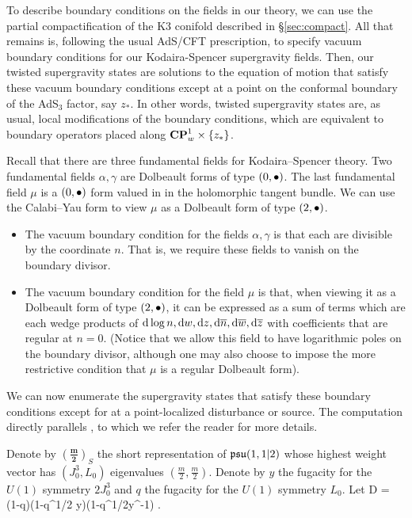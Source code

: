 \documentclass[../main.tex]{subfiles}
\begin{document}
To describe boundary conditions on the fields in our theory, we can use the partial compactification of the K3 conifold described in \S \ref{sec:compact}. All that remains is, following the usual AdS/CFT prescription, to specify vacuum boundary conditions for our Kodaira-Spencer supergravity fields. Then, our twisted supergravity states are solutions to the equation of motion that satisfy these vacuum boundary conditions except at a point on the conformal boundary of the AdS$_3$ factor, say $z_*$. In other words, twisted supergravity states are, as usual, local modifications of the boundary conditions, which are equivalent to boundary operators placed along  $\mathbf{CP}^1_w \times \left\lbrace z_* \right\rbrace$. 

Recall that there are three fundamental fields for Kodaira--Spencer theory.
Two fundamental fields $\alpha, \gamma$ are Dolbeault forms of type $(0,{\bullet})$.
The last fundamental field $\mu$ is a $(0,{\bullet})$ form valued in in the holomorphic tangent bundle.
We can use the Calabi--Yau form to view $\mu$ as a Dolbeault form of type $(2,{\bullet})$.

\begin{itemize}
\item The vacuum boundary condition for the fields $\alpha, \gamma$ is that each are divisible by the coordinate $n$. That is, we require these fields to vanish on the boundary divisor.
\item The vacuum boundary condition for the field $\mu$ is that, when viewing it as a Dolbeault form of type $(2,{\bullet})$, it can be expressed as a sum of terms which are each wedge products of $\mathrm{d} \log n, \mathrm{d} w, \mathrm{d} z , \mathrm{d} \overline n, \mathrm{d} \overline w , \mathrm{d} \overline z$ with coefficients that are regular at $n = 0$. (Notice that we allow this field to have logarithmic poles on the boundary divisor, although one may also choose to impose the more restrictive condition that $\mu$ is a regular Dolbeault form). 
\end{itemize} 

We can now enumerate the supergravity states that satisfy these boundary conditions except for at a point-localized disturbance or source. The computation directly parallels \cite{CostelloGaiotto, CP}, to which we refer the reader for more details. 

Denote by $\left(\mathbf{\frac{m}{2}}\right)_S$ the short representation of $\mathfrak{psu}(1,1|2)$ whose highest weight vector has $(J_0^3,L_0)$ eigenvalues $(\frac{m}{2}, \frac{m}{2})$. 
Denote by $y$ the fugacity for the $U(1)$ symmetry $2J_0^3$ and $q$ the fugacity for the $U(1)$ symmetry $L_0$.
Let 
\beqn
D = (1-q)(1-q^{1/2} y)(1-q^{1/2}y^{-1}) .
\eeqn
\end{document}
